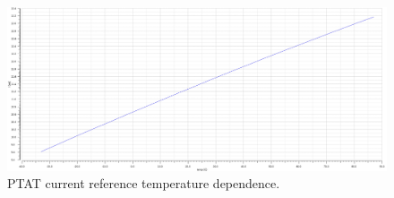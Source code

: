\documentclass[12pt,oneside,final]{siuethesis}
\theoremstyle{definition}
\begin{document}
\begin{figure}[htbp!]
\centering
\includegraphics[scale=.3,keepaspectratio=true]{../data/ptat.png} 
\caption{PTAT current reference temperature dependence.}
\label{fig:ptat}
\end{figure}
\end{document}
